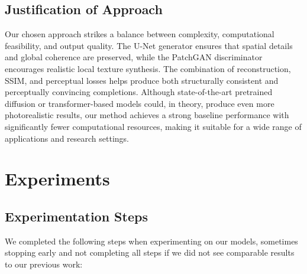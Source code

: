 \documentclass[sigconf]{acmart}
\begin{document}
\subsection*{Justification of Approach}

Our chosen approach strikes a balance between complexity, computational feasibility, and output quality. The U-Net generator ensures that spatial details and global coherence are preserved, while the PatchGAN discriminator encourages realistic local texture synthesis. The combination of reconstruction, SSIM, and perceptual losses helps produce both structurally consistent and perceptually convincing completions. Although state-of-the-art pretrained diffusion or transformer-based models could, in theory, produce even more photorealistic results, our method achieves a strong baseline performance with significantly fewer computational resources, making it suitable for a wide range of applications and research settings.

\section*{Experiments}

\subsection*{Experimentation Steps}

We completed the following steps when experimenting on our models, sometimes stopping early and not completing all steps if we did not see comparable results to our previous work:
\end{document}
